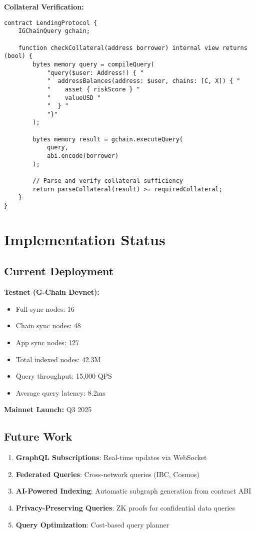 \documentclass[11pt,a4paper]{article}
\begin{document}
\textbf{Collateral Verification:}
\begin{lstlisting}[language=Solidity, basicstyle=\small\ttfamily]
contract LendingProtocol {
    IGChainQuery gchain;
    
    function checkCollateral(address borrower) internal view returns (bool) {
        bytes memory query = compileQuery(
            "query($user: Address!) { "
            "  addressBalances(address: $user, chains: [C, X]) { "
            "    asset { riskScore } "
            "    valueUSD "
            "  } "
            "}"
        );
        
        bytes memory result = gchain.executeQuery(
            query,
            abi.encode(borrower)
        );
        
        // Parse and verify collateral sufficiency
        return parseCollateral(result) >= requiredCollateral;
    }
}
\end{lstlisting}

\section{Implementation Status}

\subsection{Current Deployment}

\textbf{Testnet (G-Chain Devnet):}
\begin{itemize}
\item Full sync nodes: 16
\item Chain sync nodes: 48
\item App sync nodes: 127
\item Total indexed nodes: 42.3M
\item Query throughput: 15,000 QPS
\item Average query latency: 8.2ms
\end{itemize}

\textbf{Mainnet Launch:} Q3 2025

\subsection{Future Work}

\begin{enumerate}
\item \textbf{GraphQL Subscriptions}: Real-time updates via WebSocket
\item \textbf{Federated Queries}: Cross-network queries (IBC, Cosmos)
\item \textbf{AI-Powered Indexing}: Automatic subgraph generation from contract ABI
\item \textbf{Privacy-Preserving Queries}: ZK proofs for confidential data queries
\item \textbf{Query Optimization}: Cost-based query planner
\end{enumerate}
\end{document}
